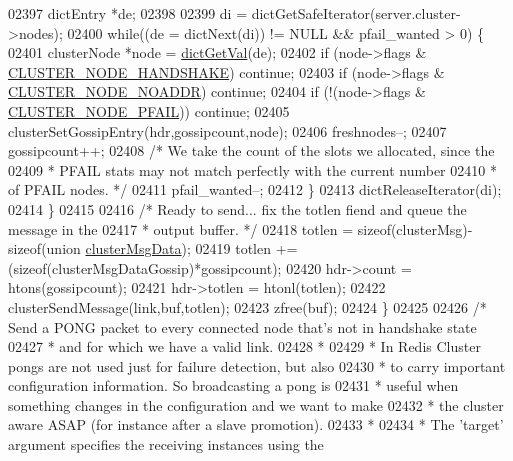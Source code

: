 \begin{DoxyCode}
{{{{{{{{{{{{{{{{{{{{{{{{{{{{{{{{{{{{{{{{02397         dictEntry *de;
02398 
02399         di = dictGetSafeIterator(server.cluster->nodes);
02400         \textcolor{keywordflow}{while}((de = dictNext(di)) != NULL && pfail\_wanted > 0) \{
02401             clusterNode *node = \hyperlink{dict_8h_ae8d2cc391873b2bea2b87c4f80f43120}{dictGetVal}(de);
02402             \textcolor{keywordflow}{if} (node->flags & \hyperlink{cluster_8h_a60571342a067f1e5772a04b36feff6a6}{CLUSTER\_NODE\_HANDSHAKE}) \textcolor{keywordflow}{continue};
02403             \textcolor{keywordflow}{if} (node->flags & \hyperlink{cluster_8h_a2bbed8bf0615871a01ca8b7f691b56d8}{CLUSTER\_NODE\_NOADDR}) \textcolor{keywordflow}{continue};
02404             \textcolor{keywordflow}{if} (!(node->flags & \hyperlink{cluster_8h_a5306c1ae8988b8be0a1a02bd9162dfa1}{CLUSTER\_NODE\_PFAIL})) \textcolor{keywordflow}{continue};
02405             clusterSetGossipEntry(hdr,gossipcount,node);
02406             freshnodes--;
02407             gossipcount++;
02408             \textcolor{comment}{/* We take the count of the slots we allocated, since the}
02409 \textcolor{comment}{             * PFAIL stats may not match perfectly with the current number}
02410 \textcolor{comment}{             * of PFAIL nodes. */}
02411             pfail\_wanted--;
02412         \}
02413         dictReleaseIterator(di);
02414     \}
02415 
02416     \textcolor{comment}{/* Ready to send... fix the totlen fiend and queue the message in the}
02417 \textcolor{comment}{     * output buffer. */}
02418     totlen = \textcolor{keyword}{sizeof}(clusterMsg)-\textcolor{keyword}{sizeof}(\textcolor{keyword}{union} \hyperlink{unionclusterMsgData}{clusterMsgData});
02419     totlen += (\textcolor{keyword}{sizeof}(clusterMsgDataGossip)*gossipcount);
02420     hdr->count = htons(gossipcount);
02421     hdr->totlen = htonl(totlen);
02422     clusterSendMessage(link,buf,totlen);
02423     zfree(buf);
02424 \}
02425 
02426 \textcolor{comment}{/* Send a PONG packet to every connected node that's not in handshake state}
02427 \textcolor{comment}{ * and for which we have a valid link.}
02428 \textcolor{comment}{ *}
02429 \textcolor{comment}{ * In Redis Cluster pongs are not used just for failure detection, but also}
02430 \textcolor{comment}{ * to carry important configuration information. So broadcasting a pong is}
02431 \textcolor{comment}{ * useful when something changes in the configuration and we want to make}
02432 \textcolor{comment}{ * the cluster aware ASAP (for instance after a slave promotion).}
02433 \textcolor{comment}{ *}
02434 \textcolor{comment}{ * The 'target' argument specifies the receiving instances using the}
}}}}}}}}}}}}}}}}}}}}}}}}}}}}}}}}}}}}}}}}
\end{DoxyCode}
